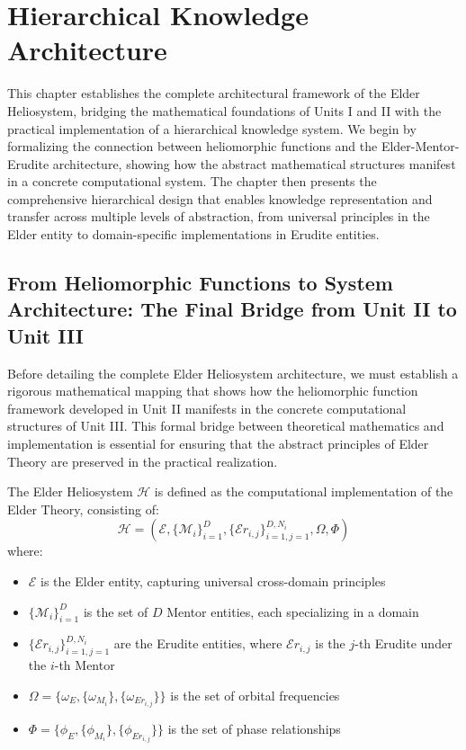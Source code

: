 \chapter{Hierarchical Knowledge Architecture}

\begin{tcolorbox}[colback=blue!5!white,colframe=blue!75!black,title=Chapter Summary]
This chapter establishes the complete architectural framework of the Elder Heliosystem, bridging the mathematical foundations of Units I and II with the practical implementation of a hierarchical knowledge system. We begin by formalizing the connection between heliomorphic functions and the Elder-Mentor-Erudite architecture, showing how the abstract mathematical structures manifest in a concrete computational system. The chapter then presents the comprehensive hierarchical design that enables knowledge representation and transfer across multiple levels of abstraction, from universal principles in the Elder entity to domain-specific implementations in Erudite entities.
\end{tcolorbox}

\section{From Heliomorphic Functions to System Architecture: The Final Bridge from Unit II to Unit III}

Before detailing the complete Elder Heliosystem architecture, we must establish a rigorous mathematical mapping that shows how the heliomorphic function framework developed in Unit II manifests in the concrete computational structures of Unit III. This formal bridge between theoretical mathematics and implementation is essential for ensuring that the abstract principles of Elder Theory are preserved in the practical realization.

\begin{definition}
\label{def:heliosystem_structure}
The Elder Heliosystem $\mathcal{H}$ is defined as the computational implementation of the Elder Theory, consisting of:
\begin{equation}
\mathcal{H} = (\mathcal{E}, \{\mathcal{M}_i\}_{i=1}^D, \{\mathcal{E}r_{i,j}\}_{i=1,j=1}^{D,N_i}, \Omega, \Phi)
\end{equation}
where:
\begin{itemize}
    \item $\mathcal{E}$ is the Elder entity, capturing universal cross-domain principles
    \item $\{\mathcal{M}_i\}_{i=1}^D$ is the set of $D$ Mentor entities, each specializing in a domain
    \item $\{\mathcal{E}r_{i,j}\}_{i=1,j=1}^{D,N_i}$ are the Erudite entities, where $\mathcal{E}r_{i,j}$ is the $j$-th Erudite under the $i$-th Mentor
    \item $\Omega = \{\omega_E, \{\omega_{M_i}\}, \{\omega_{Er_{i,j}}\}\}$ is the set of orbital frequencies
    \item $\Phi = \{\phi_E, \{\phi_{M_i}\}, \{\phi_{Er_{i,j}}\}\}$ is the set of phase relationships
\end{itemize}
\end{definition}

